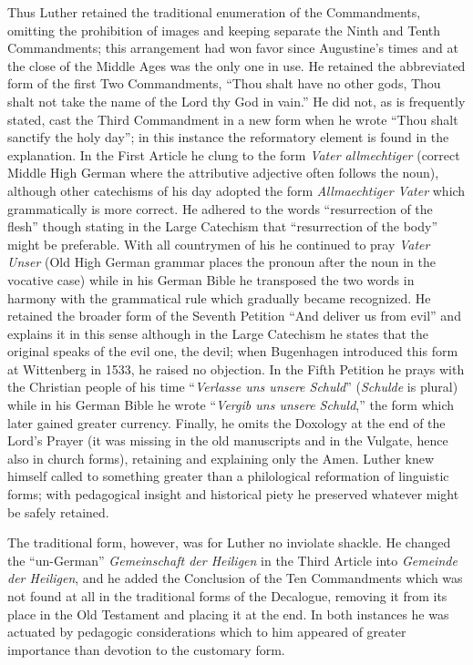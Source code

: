Thus Luther retained the traditional enumeration of the Commandments, omitting the prohibition of images and keeping separate the Ninth and Tenth Commandments; this arrangement had won favor since Augustine’s times and at the close of the Middle Ages was the only one in use. He retained the abbreviated form of the first Two Commandments, “Thou shalt have no other gods, Thou shalt not take the name of the Lord thy God in vain.” He did not, as is frequently stated, cast the Third Commandment in a new form when he wrote “Thou shalt sanctify the holy day”; in this instance the reformatory element is found in the explanation. In the First Article he clung to the form \emph{Vater allmechtiger} (correct Middle High German where the attributive adjective often follows the noun), although other catechisms of his day adopted the form \emph{Allmaechtiger Vater} which grammatically is more correct. He adhered to the words “resurrection of the flesh” though stating in the Large Catechism that “resurrection of the body” might be preferable. With all countrymen of his he continued to pray \emph{Vater Unser} (Old High German grammar places the pronoun after the noun in the vocative case) while in his German Bible he transposed the two words in harmony with the grammatical rule which gradually became recognized. He retained the broader form of the Seventh Petition “And deliver us from evil” and explains it in this sense although in the Large Catechism he states that the original speaks of the evil one, the devil; when Bugenhagen introduced this form at Wittenberg in 1533, he raised no objection. In the Fifth Petition he prays with the Christian people of his time “\emph{Verlasse uns unsere Schuld}” (\emph{Schulde} is plural) while in his German Bible he wrote “\emph{Vergib uns unsere Schuld},” the form which later gained greater currency. Finally, he omits the Doxology at the end of the Lord’s Prayer (it was missing in the old manuscripts and in the Vulgate, hence also in church forms), retaining and explaining only the Amen. Luther knew himself called to something greater than a philological reformation of linguistic forms; with pedagogical insight and historical piety he preserved whatever might be safely retained.

The traditional form, however, was for Luther no inviolate
shackle. He changed the “un-German” \emph{Gemeinschaft der Heiligen} in the Third Article into \emph{Gemeinde der Heiligen}, and he added the Conclusion of the Ten Commandments which was not found at all in the traditional forms of the Decalogue, removing it from its place in the Old Testament and placing it at the end. In both instances he was actuated by pedagogic considerations which to him appeared of greater importance than devotion to the customary form.

